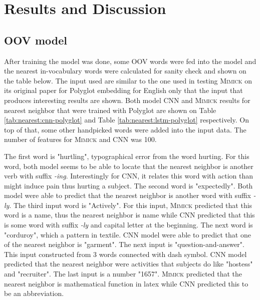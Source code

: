 \chapter{Results and Discussion}
\label{chap:results}
    \section{OOV model}
        After training the model was done, some OOV words were fed
        into the model and the nearest in-vocabulary words were
        calculated for sanity check and shown on the table below. The
        input used are similar to the one used in testing
        \textsc{Mimick} on its original paper for Polyglot embedding
        for English  only that the input that produces interesting
        results are shown. Both model CNN and \textsc{Mimick} results
        for nearest neighbor that were trained with Polyglot are shown
        on Table \ref{tab:nearest:cnn-polyglot} and Table
        \ref{tab:nearest:lstm-polyglot} respectively. On top of that,
        some other handpicked words were added into the input data.
        The number of features for \textsc{Mimick} and CNN was 100.

        The first word is "hurtling", typographical error from the
        word hurting. For this word, both model seems to be able to
        locate that the nearest neighbor is another verb with suffix
        \textit{-ing}. Interestingly for CNN, it relates this word
        with action than might induce pain thus hurting a subject. The
        second word is "expectedly". Both model were able to predict
        that the nearest neighbor is another word with suffix
        \textit{-ly}. The third input word is "Actively". For this
        input, \textsc{Mimick} predicted that this word is a name,
        thus the nearest neighbor is name while CNN predicted that
        this is some word with suffix \textit{-ly} and capital letter
        at the beginning. The next word is "corduroy", which a pattern
        in textile. CNN model were able to predict that one of the
        nearest neighbor is "garment". The next input is
        "question-and-answer". This input constructed from 3 words
        connected with dash symbol. CNN model predicted that the
        nearest neighbor were activities that subjects do like
        "hostess" and "recruiter". The last input is a number "1657".
        \textsc{Mimick} predicted that the nearest neighbor is
        mathematical function in latex while CNN predicted this to be
        an abbreviation.

